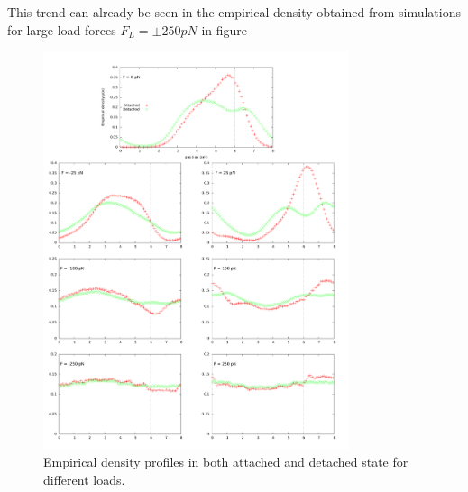 \documentclass[aps,pre,onecolumn,showpacs,showkeys,a4paper]{revtex4}
\begin{document}
This trend can already be seen in the empirical density obtained from simulations for large load forces $F_L =\pm250 pN$ in figure %
\begin{figure}[h]
\centering
\includegraphics[width=0.8\textwidth,height=!]{pos_multiplot}
\caption{Empirical density profiles in both attached and detached state for different loads.}
\label{Fig: pos_multiplot}
\end{figure}
\end{document}
